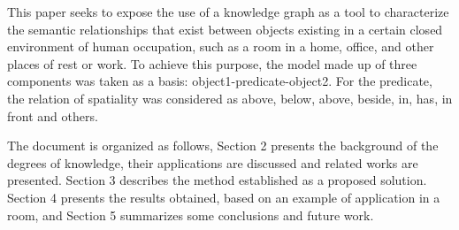 This paper seeks to expose the use of a knowledge graph as a tool to characterize the semantic relationships that exist between objects existing in a certain closed environment of human occupation, such as a room in a home, office, and other places of rest or work. To achieve this purpose, the model made up of three components was taken as a basis: object1-predicate-object2. For the predicate, the relation of spatiality was considered as above, below, above, beside, in, has, in front and others.

The document is organized as follows, Section 2 presents the background of the degrees of knowledge, their applications are discussed and related works are presented. Section 3 describes the method established as a proposed solution. Section 4 presents the results obtained, based on an example of application in a room, and Section 5 summarizes some conclusions and future work.
